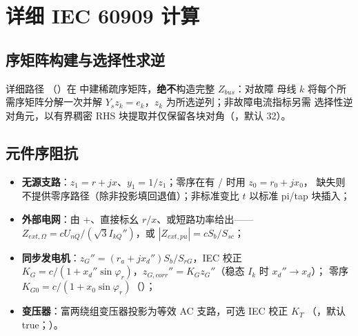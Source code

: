 \section{详细 IEC 60909 计算}\label{sec:sc-detailed}

\subsection{序矩阵构建与选择性求逆}
详细路径 （）在
 中建稀疏序矩阵，\textbf{绝不}构造完整 $Z_{bus}$：对故障
母线 $k$ 将每个所需序矩阵分解一次并解 $Y_s z_k=e_k$，$z_k$ 为所选逆列；非故障电流指标另需
选择性逆对角元，以有界稠密 RHS 块提取并仅保留各块对角（，默认 32）。

\subsection{元件序阻抗}
\begin{itemize}
  \item \textbf{无源支路}：$z_1=r+jx$、$y_1=1/z_1$；零序在有 / 时用 $z_0=r_0+jx_0$，
        缺失则不提供零序路径（除非投影填回退值）；非标准变比 $t$ 以标准 pi/tap 块插入；
  \item \textbf{外部电网}：由 +、直接标幺 $r/x$、或短路功率给出——
        $Z_{ext,\Omega}=cU_{nQ}/(\sqrt3 I_{kQ}'')$，或 $|Z_{ext,pu}|=cS_b/S_{sc}$；
  \item \textbf{同步发电机}：$z_G''=(r_a+jx_d'')S_b/S_{rG}$，IEC 校正
        $K_G=c/(1+x_d''\sin\varphi_r)$，$z_{G,corr}''=K_G z_G''$（稳态 $I_k$ 时 $x_d''\to x_d$）；
        零序 $K_{G0}=c/(1+x_0\sin\varphi_r)$（）；
  \item \textbf{变压器}：富两绕组变压器投影为等效 AC 支路，可选 IEC 校正 $K_T$
        （，默认 true；）。
\end{itemize}

